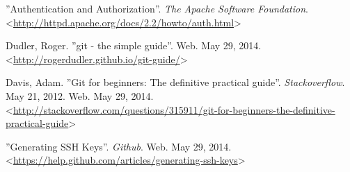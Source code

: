  ''Authentication and Authorization''. \textit{The
Apache Software Foundation}.
<\url{http://httpd.apache.org/docs/2.2/howto/auth.html}>

 Dudler, Roger. ''git - the simple guide''. Web. May 29, 2014. 
<\url{http://rogerdudler.github.io/git-guide/}>

 Davis, Adam. ''Git for beginners: The definitive
practical guide''. \textit{Stackoverflow}. May 21, 2012. Web. May 29, 2014.
<\url{http://stackoverflow.com/questions/315911/git-for-beginners-the-definitive-practical-guide}>

 ''Generating SSH Keys''. \textit{Github}.  Web. May 29,
2014. <\url{https://help.github.com/articles/generating-ssh-keys}>
